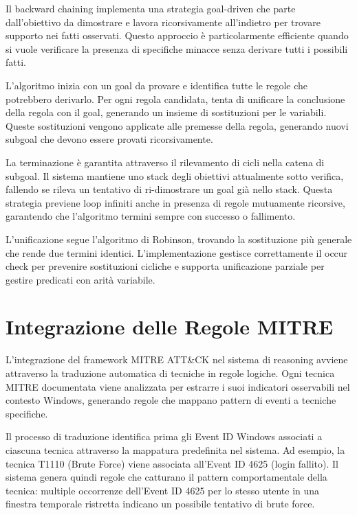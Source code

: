 \documentclass[12pt,a4paper]{report}
\theoremstyle{definition}
\begin{document}
Il backward chaining implementa una strategia goal-driven che parte dall'obiettivo da dimostrare e lavora ricorsivamente all'indietro per trovare supporto nei fatti osservati. Questo approccio è particolarmente efficiente quando si vuole verificare la presenza di specifiche minacce senza derivare tutti i possibili fatti.

L'algoritmo inizia con un goal da provare e identifica tutte le regole che potrebbero derivarlo. Per ogni regola candidata, tenta di unificare la conclusione della regola con il goal, generando un insieme di sostituzioni per le variabili. Queste sostituzioni vengono applicate alle premesse della regola, generando nuovi subgoal che devono essere provati ricorsivamente.

La terminazione è garantita attraverso il rilevamento di cicli nella catena di subgoal. Il sistema mantiene uno stack degli obiettivi attualmente sotto verifica, fallendo se rileva un tentativo di ri-dimostrare un goal già nello stack. Questa strategia previene loop infiniti anche in presenza di regole mutuamente ricorsive, garantendo che l'algoritmo termini sempre con successo o fallimento.

L'unificazione segue l'algoritmo di Robinson, trovando la sostituzione più generale che rende due termini identici. L'implementazione gestisce correttamente il occur check per prevenire sostituzioni cicliche e supporta unificazione parziale per gestire predicati con arità variabile.

\section{Integrazione delle Regole MITRE}

L'integrazione del framework MITRE ATT\&CK nel sistema di reasoning avviene attraverso la traduzione automatica di tecniche in regole logiche. Ogni tecnica MITRE documentata viene analizzata per estrarre i suoi indicatori osservabili nel contesto Windows, generando regole che mappano pattern di eventi a tecniche specifiche.

Il processo di traduzione identifica prima gli Event ID Windows associati a ciascuna tecnica attraverso la mappatura predefinita nel sistema. Ad esempio, la tecnica T1110 (Brute Force) viene associata all'Event ID 4625 (login fallito). Il sistema genera quindi regole che catturano il pattern comportamentale della tecnica: multiple occorrenze dell'Event ID 4625 per lo stesso utente in una finestra temporale ristretta indicano un possibile tentativo di brute force.
\end{document}
